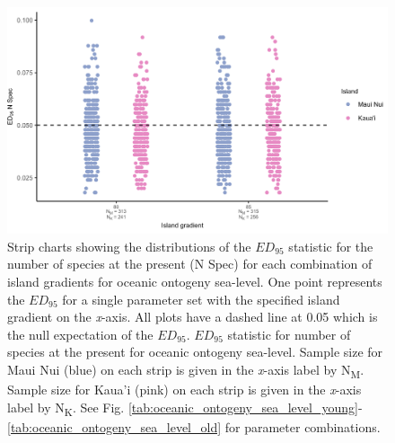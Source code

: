 \begin{figure}
    \centering
    \includegraphics{JBI-21-0508_FigS12.png}
    \caption{Strip charts showing the distributions of the $ED_{95}$ statistic for the number of species at the present (N Spec) for each combination of island gradients for oceanic ontogeny sea-level. One point represents the $ED_{95}$ for a single parameter set with the specified island gradient on the \textit{x}-axis. All plots have a dashed line at 0.05 which is the null expectation of the $ED_{95}$. $ED_{95}$ statistic for number of species at the present for oceanic ontogeny sea-level. Sample size for Maui Nui (blue) on each strip is given in the \textit{x}-axis label by N\textsubscript{M}. Sample size for Kaua'i (pink) on each strip is given in the \textit{x}-axis label by N\textsubscript{K}. See Fig. \ref{tab:oceanic_ontogeny_sea_level_young}-\ref{tab:oceanic_ontogeny_sea_level_old} for parameter combinations.}
    \label{fig:Island_gradient_ontogeny_sea_level_num_spec}
\end{figure}

